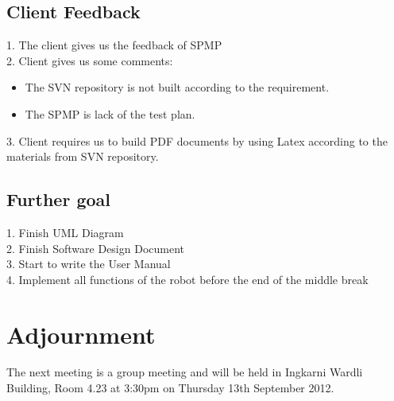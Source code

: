 \documentclass[11pt, a4paper]{article}
\begin{document}
\subsection{Client Feedback}
1. The client gives us the feedback of SPMP\\
2. Client gives us some comments:
\begin{itemize}
\item The SVN repository is not built according to the requirement.
\item The SPMP is lack of the test plan.
\end{itemize}
3. Client requires us to build PDF documents by using Latex according to the materials from SVN repository.\\   

\subsection{Further goal}
1. Finish UML Diagram\\
2. Finish Software Design Document\\
3. Start to write the User Manual\\
4. Implement all functions of the robot before the end of the middle break\\

\section{Adjournment}
The next meeting is a group meeting and will be held in Ingkarni Wardli Building, Room 4.23 at 3:30pm on Thursday 13th September 2012.

\vspace*{10pt}
\end{document}
